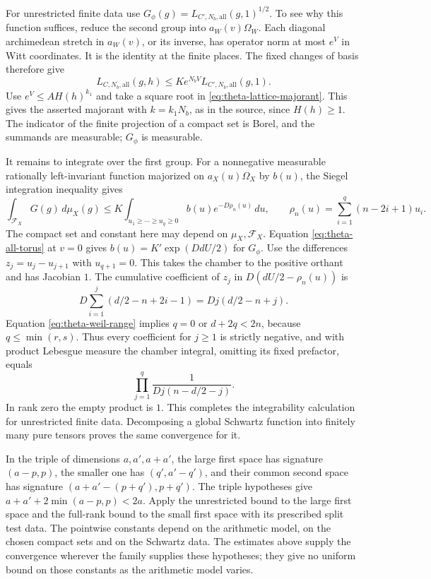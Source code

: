For unrestricted finite data use
\(G_\phi(g)=L_{C',N_b,\mathrm{all}}(g,1)^{1/2}\).
To see why this function suffices, reduce the second group into
\(a_W(v)\Omega_W\). Each diagonal archimedean stretch in
\(a_W(v)\), or its inverse, has operator norm at most \(e^V\)
in Witt coordinates. It is the identity at the finite places.
The fixed changes of basis therefore give
\[
 L_{C,N_b,\mathrm{all}}(g,h)\le K e^{N_bV}
                L_{C',N_b,\mathrm{all}}(g,1).
\]
Use \(e^V\le A H(h)^{k_1}\) and take a square root in
\eqref{eq:theta-lattice-majorant}. This gives the asserted majorant
with \(k=k_1N_b\), as in the source, since \(H(h)\ge1\).
The indicator of the finite projection of a compact set is Borel,
and the summands are measurable; \(G_\phi\) is measurable.

It remains to integrate over the first group. For a nonnegative
measurable rationally left-invariant function majorized on
\(a_X(u)\Omega_X\) by \(b(u)\), the Siegel integration inequality gives
\[
 \int_{\mathcal F_X}G(g)\,d\mu_X(g)
 \le K\int_{u_1\ge\cdots\ge u_q\ge0} b(u)e^{-D\rho_n(u)}\,du,
 \qquad
 \rho_n(u)=\sum_{i=1}^q(n-2i+1)u_i .
\]
The compact set and constant here may depend on \(\mu_X,\mathcal F_X\).
Equation \eqref{eq:theta-all-torus} at \(v=0\) gives
\(b(u)=K'\exp(DdU/2)\) for \(G_\phi\). Use the differences
\(z_j=u_j-u_{j+1}\) with \(u_{q+1}=0\). This takes the chamber to
the positive orthant and has Jacobian \(1\). The cumulative coefficient
of \(z_j\) in \(D(dU/2-\rho_n(u))\) is
\[
 D\sum_{i=1}^j(d/2-n+2i-1)=Dj(d/2-n+j).
\]
Equation \eqref{eq:theta-weil-range} implies \(q=0\) or
\(d+2q<2n\), because \(q\le\min(r,s)\). Thus every coefficient
for \(j\ge1\) is strictly negative, and with product Lebesgue measure
the chamber integral, omitting its fixed prefactor, equals
\begin{equation}
 \prod_{j=1}^q \frac{1}{Dj(n-d/2-j)}.
 \label{eq:theta-integral-product}
\end{equation}
In rank zero the empty product is \(1\). This completes the
integrability calculation for unrestricted finite data. Decomposing a
global Schwartz function into finitely many pure tensors proves the
same convergence for it.

In the triple of dimensions \(a,a',a+a'\), the large first space
has signature \((a-p,p)\), the smaller one has \((q',a'-q')\),
and their common second space has signature
\((a+a'-(p+q'),p+q')\). The triple hypotheses give
\(a+a'+2\min(a-p,p)<2a\). Apply the unrestricted bound to the
large first space and the full-rank bound to the small first space
with its prescribed split test data. The pointwise constants depend
on the arithmetic model, on the chosen compact sets and on the
Schwartz data. The estimates above supply the convergence wherever
the family supplies these hypotheses; they give no uniform bound
on those constants as the arithmetic model varies.

